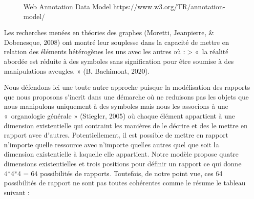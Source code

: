 \documentclass[
  a4paper,
  DIV=11,
  numbers=noendperiod]{scrreprt}
\begin{document}
\begin{figure}


\caption{\label{fig-webAnnotation}Web Annotation Data Model
https://www.w3.org/TR/annotation-model/}

\end{figure}%

Les recherches menées en théories des graphes (Moretti, Jeanpierre, \&
Dobenesque, 2008) ont montré leur souplesse dans la capacité de mettre
en relation des éléments hétérogènes les uns avec les autres où :
\textgreater{} «~la réalité abordée est réduite à des symboles sans
signification pour être soumise à des manipulations aveugles. » (B.
Bachimont, 2020).

Nous défendons ici une toute autre approche puisque la modélisation des
rapports que nous proposons s'incrit dans une démarche où ne reduisons
pas les objets que nous manipulons uniquement à des symboles mais nous
les associons à une «~organologie générale » (Stiegler, 2005) où chaque
élément appartient à une dimension existentielle qui contraint les
manières de le décrire et des le mettre en rapport avec d'autres.
Potentiellement, il est possible de mettre en rapport n'importe quelle
ressource avec n'importe quelles autres quel que soit la dimension
existentielle à laquelle elle appartient. Notre modèle propose quatre
dimensions existentielles et trois positions pour définir un rapport ce
qui donne 4*4*4 = 64 possibilités de rapports. Toutefois, de notre point
vue, ces 64 possibilités de rapport ne sont pas toutes cohérentes comme
le résume le tableau suivant :
\end{document}
